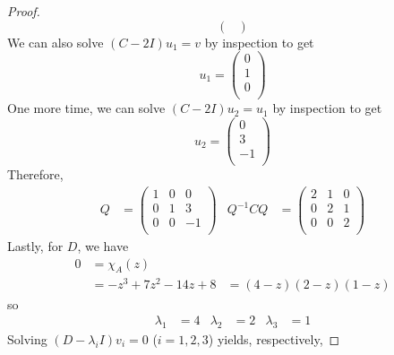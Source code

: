 \documentclass[../psets.tex]{subfiles}
\begin{document}
\begin{enumerate}
\begin{proof}
\begin{equation*}
\begin{pmatrix}
            \end{pmatrix}
        \end{equation*}
        We can also solve $(C-2I)u_1=v$ by inspection to get
        \begin{equation*}
            u_1 =
            \begin{pmatrix}
                0\\
                1\\
                0\\
            \end{pmatrix}
        \end{equation*}
        One more time, we can solve $(C-2I)u_2=u_1$ by inspection to get
        \begin{equation*}
            u_2 =
            \begin{pmatrix}
                0\\
                3\\
                -1\\
            \end{pmatrix}
        \end{equation*}
        Therefore,
        \begin{align*}
            Q &=
            \begin{pmatrix}
                1 & 0 & 0\\
                0 & 1 & 3\\
                0 & 0 & -1\\
            \end{pmatrix}&
            Q^{-1}CQ &=
            \begin{pmatrix}
                2 & 1 & 0\\
                0 & 2 & 1\\
                0 & 0 & 2\\
            \end{pmatrix}
        \end{align*}
        Lastly, for $D$, we have
        \begin{align*}
            0 &= \chi_A(z)\\
            &= -z^3+7z^2-14z+8
            &= (4-z)(2-z)(1-z)
        \end{align*}
        so
        \begin{align*}
            \lambda_1 &= 4&
            \lambda_2 &= 2&
            \lambda_3 &= 1
        \end{align*}
        Solving $(D-\lambda_iI)v_i=0$ ($i=1,2,3$) yields, respectively,

\end{proof}
\end{enumerate}
\end{document}

